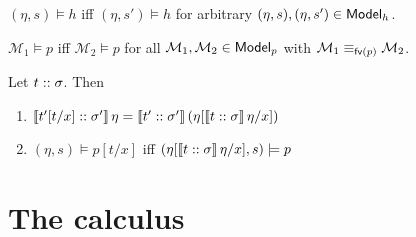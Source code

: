 \documentclass[12pt,a4paper]{report}
\begin{document}
\begin{lemma}
  $(\eta,s) \models h$ iff $(\eta,s') \models h$ for arbitrary $(\eta,s),(\eta,s')\in\mathsf{Model}_h$.
\end{lemma}

\begin{lemma}[Coincidence]
  $\mathcal{M}_1 \models p$ iff $\mathcal{M}_2 \models p$ for all $\mathcal{M}_1,\mathcal{M}_2\in\mathsf{Model}_p$
  with $\mathcal{M}_1 \equiv_{\mathsf{fv}(p)} \mathcal{M}_2$.
\end{lemma}

\begin{lemma}[Substitution]
  Let ${t}\mathrel{::}{\sigma}$. Then
  \begin{enumerate}
    \item $\llbracket{t'[t/x]}\mathrel{::}{\sigma'}\rrbracket\,\eta
           = \llbracket{t'}\mathrel{::}{\sigma'}\rrbracket\,(\eta[\llbracket{t}\mathrel{::}{\sigma}\rrbracket\,\eta/x])$
    \item $(\eta,s) \models p[t/x]$ iff $(\eta[\llbracket{t}\mathrel{::}{\sigma}\rrbracket\,\eta/x],s) \models p$
  \end{enumerate}
\end{lemma}



\chapter{The calculus}
\end{document}
